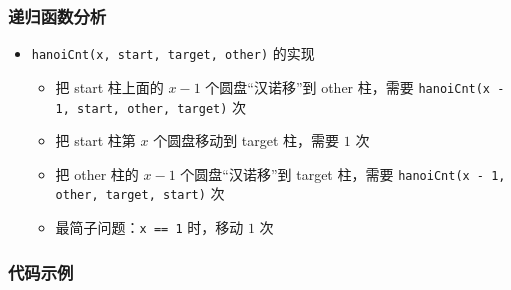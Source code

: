 \begin{frame}[fragile]
    \frametitle{递归函数分析}
    
    \begin{itemize}
        \item \lstinline|hanoiCnt(x, start, target, other)| 的实现
        \begin{itemize}
            \item 把 start 柱上面的 $x - 1$ 个圆盘“汉诺移”到 other 柱，需要 \lstinline|hanoiCnt(x - 1, start, other, target)| 次
            \item 把 start 柱第 $x$ 个圆盘移动到 target 柱，需要 $1$ 次
            \item 把 other 柱的 $x - 1$ 个圆盘“汉诺移”到 target 柱，需要 \lstinline|hanoiCnt(x - 1, other, target, start)| 次
            \item 最简子问题：\lstinline|x == 1| 时，移动 $1$ 次
        \end{itemize}
    \end{itemize}

\end{frame}

\begin{frame}[fragile]
    \frametitle{代码示例}
    

     {
        \begin{columns}
            

        \end{columns}
    }

\end{frame}



